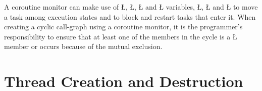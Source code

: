 \documentclass[openright,twoside]{report}
\begin{document}
A coroutine monitor can make use of \LGinlinetrue\LGbegin\lgrinde\L{}\endlgrinde\LGend{}, \LGinlinetrue\LGbegin\lgrinde\L{}\endlgrinde\LGend{}, \LGinlinetrue\LGbegin\lgrinde\L{}\endlgrinde\LGend{} and \LGinlinetrue\LGbegin\lgrinde\L{}\endlgrinde\LGend{} variables, \LGinlinetrue\LGbegin\lgrinde\L{}\endlgrinde\LGend{}, \LGinlinetrue\LGbegin\lgrinde\L{}\endlgrinde\LGend{} and \LGinlinetrue\LGbegin\lgrinde\L{}\endlgrinde\LGend{} to move a task among execution states and to block and restart tasks that enter it.
When creating a cyclic call-graph using a coroutine monitor, it is the programmer's responsibility to ensure that at least one of the members in the cycle is a \LGinlinetrue\LGbegin\lgrinde\L{}\endlgrinde\LGend{} member or  occurs because of the mutual exclusion.


\section{Thread Creation and Destruction}
\end{document}
